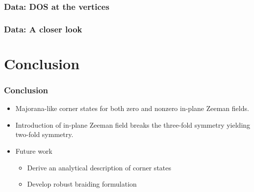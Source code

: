 \documentclass[xcolor=dvipsnames,10pt]{beamer}
\newcommand{\DA}{Data}
\newcommand{\CO}{Conclusion}
\begin{document}
  \begin{frame}
    \frametitle{\DA: DOS at the vertices}

    \begin{figure}
    \end{figure}
  \end{frame}

  \begin{frame}
    \frametitle{\DA: A closer look}

    \begin{figure}
    \end{figure}
  \end{frame}

  \section{\CO}
  \begin{frame}
    \frametitle{\CO}
    \begin{itemize}
      \item Majorana-like corner states for both zero and nonzero in-plane Zeeman fields.
      \item Introduction of in-plane Zeeman field breaks the three-fold symmetry yielding two-fold symmetry.
      \item Future work
        \begin{itemize}
          \item Derive an analytical description of corner states
          \item Develop robust braiding formulation
        \end{itemize}
    \end{itemize}
  \end{frame}
\end{document}

